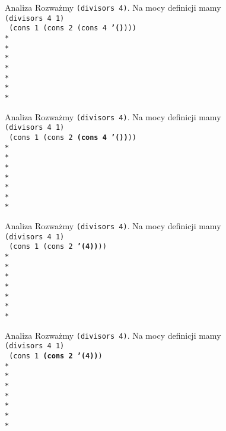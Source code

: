 \begin{frame}{Analiza}
  Rozważmy \texttt{(divisors 4)}. Na mocy definicji mamy\\
  \texttt{(divisors 4 1)}\\
  \texttt{
    (cons 1 (cons 2 (cons 4 \textbf{'()})))\\*
    \ \\*
    \ \\*
    \ \\*
    \ \\*
    \ \\*
    \ \\*
  }
\end{frame}

\begin{frame}{Analiza}
  Rozważmy \texttt{(divisors 4)}. Na mocy definicji mamy\\
  \texttt{(divisors 4 1)}\\
  \texttt{
    (cons 1 (cons 2 \textbf{(cons 4 '())}))\\*
    \ \\*
    \ \\*
    \ \\*
    \ \\*
    \ \\*
    \ \\*
  }
\end{frame}

\begin{frame}{Analiza}
  Rozważmy \texttt{(divisors 4)}. Na mocy definicji mamy\\
  \texttt{(divisors 4 1)}\\
  \texttt{
    (cons 1 (cons 2 \textbf{'(4))}))\\*
    \ \\*
    \ \\*
    \ \\*
    \ \\*
    \ \\*
    \ \\*
  }
\end{frame}

\begin{frame}{Analiza}
  Rozważmy \texttt{(divisors 4)}. Na mocy definicji mamy\\
  \texttt{(divisors 4 1)}\\
  \texttt{
    (cons 1 \textbf{(cons 2 '(4))})\\*
    \ \\*
    \ \\*
    \ \\*
    \ \\*
    \ \\*
    \ \\*
  }
\end{frame}

